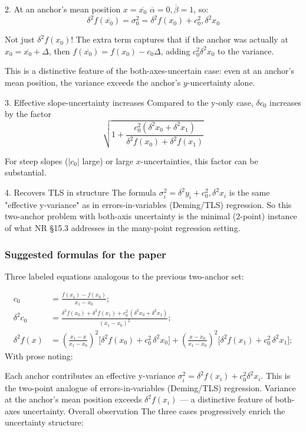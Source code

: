 \documentclass[twoside]{article}
\numberwithin{equation}{section}
\begin{document}
2. At an anchor's mean position $x = \overline{x_0}$
$\overline{\alpha} = 0, \overline{\beta} = 1$, so:
$$\delta^2 f(\overline{x_0}) = \sigma_0^2 = \delta^2 f(x_0) + c_0^2, \delta^2 x_0$$

Not just $\delta^2 f(x_0)$! The extra term captures that if the anchor was actually at $x_0 = \overline{x_0} + \Delta$, then $f(\overline{x_0}) = f(x_0) - c_0 \Delta$, adding $c_0^2 \delta^2 x_0$ to the variance.

This is a distinctive feature of the both-axes-uncertain case: even at an anchor's mean position, the variance exceeds the anchor's $y$-uncertainty alone.

3. Effective slope-uncertainty increases
Compared to the y-only case, $\delta c_0$ increases by the factor
$$\sqrt{1 + \frac{c_0^2 (\delta^2 x_0 + \delta^2 x_1)}{\delta^2 f(x_0) + \delta^2 f(x_1)}}$$

For steep slopes ($|c_0|$ large) or large $x$-uncertainties, this factor can be substantial.

4. Recovers TLS in structure
The formula $\sigma_i^2 = \delta^2 y_i + c_0^2, \delta^2 x_i$ is the same "effective y-variance" as in errors-in-variables (Deming/TLS) regression. So this two-anchor problem with both-axis uncertainty is the minimal (2-point) instance of what NR §15.3 addresses in the many-point regression setting.

\subsubsection{Suggested formulas for the paper}
Three labeled equations analogous to the previous two-anchor set:


\begin{align}
\label{eqn: first-order ODE two anchors slope xy}
c_0 &= \frac{f(x_1) - f(x_0)}{x_1 - x_0}; \\
\label{eqn: first-order ODE two anchors delta c xy}
\delta^2 c_0 &= \frac{\delta^2 f(x_0) + \delta^2 f(x_1) + c_0^2\,(\delta^2 x_0 + \delta^2 x_1)}{(x_1 - x_0)^2}; \\
\label{eqn: first-order ODE two anchors variance xy}
\delta^2 f(x) &= \left(\frac{x_1 - x}{x_1 - x_0}\right)^2 \bigl[\delta^2 f(x_0) + c_0^2\,\delta^2 x_0\bigr]
             + \left(\frac{x - x_0}{x_1 - x_0}\right)^2 \bigl[\delta^2 f(x_1) + c_0^2\,\delta^2 x_1\bigr];
\end{align}
With prose noting:

Each anchor contributes an effective y-variance $\sigma_i^2 = \delta^2 f(x_i) + c_0^2 \delta^2 x_i$.
This is the two-point analogue of errors-in-variables (Deming/TLS) regression.
Variance at the anchor's mean position exceeds $\delta^2 f(x_i)$ — a distinctive feature of both-axes uncertainty.
Overall observation
The three cases progressively enrich the uncertainty structure:
\end{document}
